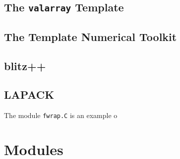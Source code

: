 \subsection{The \texttt{valarray} Template}

\subsection{The Template Numerical Toolkit}

\subsection{blitz++}

\subsection{LAPACK}
The module \texttt{fwrap.C} is an example o


\section{Modules}

